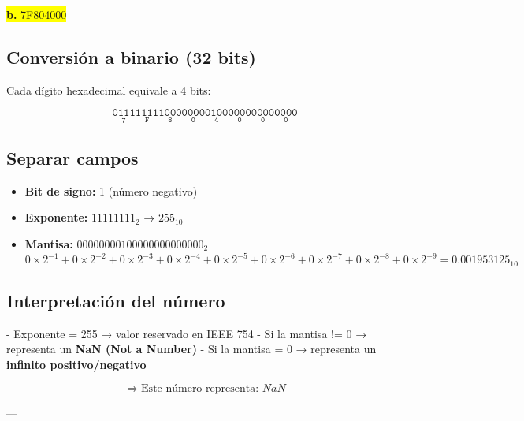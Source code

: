\documentclass[a4paper,12pt]{article}
\begin{document}
	\begin{center}
		\colorbox{yellow}{\textbf{b.} 7F804000}
		\subsection*{Conversión a binario (32 bits)}
		Cada dígito hexadecimal equivale a 4 bits:
		
		\[
		\mathtt{
			\underset{\text{7}}{\boxed{\mathtt{0111}}}
			\underset{\text{F}}{\boxed{\mathtt{1111}}}
			\underset{\text{8}}{\boxed{\mathtt{1000}}}
			\underset{\text{0}}{\boxed{\mathtt{0000}}}
			\underset{\text{4}}{\boxed{\mathtt{0100}}}
			\underset{\text{0}}{\boxed{\mathtt{0000}}}
			\underset{\text{0}}{\boxed{\mathtt{0000}}}
			\underset{\text{0}}{\boxed{\mathtt{0000}}}
		}	
		\]
		
		\subsection*{Separar campos}
		
		\begin{itemize}
			\item \textbf{Bit de signo:} 1 (número negativo)
			\item \textbf{Exponente:} $11111111_2$ → $255_{10}$
			\item \textbf{Mantisa:} $00000000100000000000000_2$ 
			\[
			0\times2^{-1} + 0\times2^{-2} + 0\times2^{-3} + 0\times2^{-4} + 0\times2^{-5} + 0\times2^{-6} + 0\times2^{-7} + 0\times2^{-8} + 0\times2^{-9}= 0.001953125_{10}
			\]
		\end{itemize}
		
		\subsection*{Interpretación del número}
		
		- Exponente = 255 → valor reservado en IEEE 754\newline
		- Si la mantisa != 0 → representa un \textbf{NaN (Not a Number)}\newline
		- Si la mantisa = 0 → representa un \textbf{infinito positivo/negativo}
		
		\[
		\Rightarrow \text{Este número representa: } \boxed{NaN}
		\]
		
		---
	\end{center}
\end{document}
